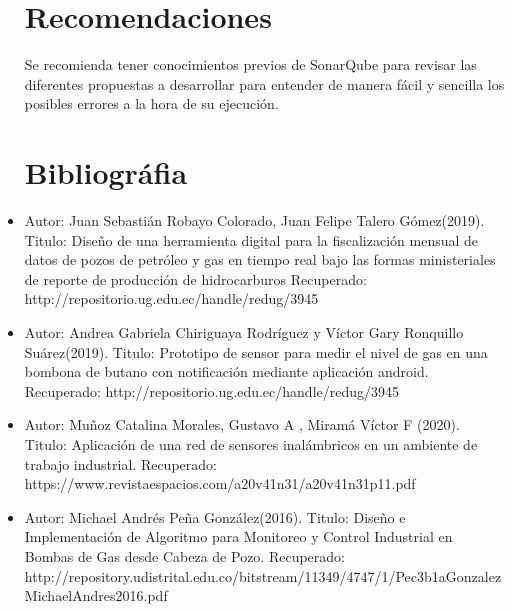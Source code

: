 \documentclass[twoside,twocolumn]{article}
\begin{document}
\begin{itemize}
\section{Recomendaciones}
Se recomienda tener conocimientos previos de SonarQube para revisar las diferentes propuestas a desarrollar para entender de manera fácil y sencilla los posibles errores a la hora de su ejecución.

\section{Bibliográfia}
\item Autor: Juan Sebastián Robayo Colorado, Juan Felipe Talero Gómez(2019).
\newline
\newline
Titulo: Diseño de una herramienta digital para la fiscalización mensual de datos de pozos de petróleo y gas en tiempo real bajo las formas ministeriales de reporte de producción de hidrocarburos
\newline
\newline
Recuperado: http://repositorio.ug.edu.ec/handle/redug/3945
\newline
\newline

\item Autor: Andrea Gabriela Chiriguaya Rodríguez y Víctor Gary Ronquillo Suárez(2019).
\newline
\newline
Titulo: Prototipo de sensor para medir el nivel de gas en una bombona de butano con notificación mediante aplicación android.
\newline
\newline
Recuperado: http://repositorio.ug.edu.ec/handle/redug/3945
\newline
\newline

\item Autor: Muñoz Catalina Morales, Gustavo A , Miramá Víctor F (2020).
\newline
\newline
Titulo: Aplicación de una red de sensores inalámbricos en un ambiente de trabajo industrial.
\newline
\newline
Recuperado: https://www.revistaespacios.com/a20v41n31/a20v41n31p11.pdf
\newline
\newline

\item Autor: Michael Andrés Peña González(2016).
\newline
\newline
Titulo: Diseño e Implementación de Algoritmo para Monitoreo y Control Industrial en Bombas de Gas desde Cabeza de Pozo.
\newline
\newline
Recuperado: http://repository.udistrital.edu.co/bitstream/11349/4747/1/Pec3b1aGonzalezMichaelAndres2016.pdf
\newline
\newline

\end{itemize}
\end{document}
